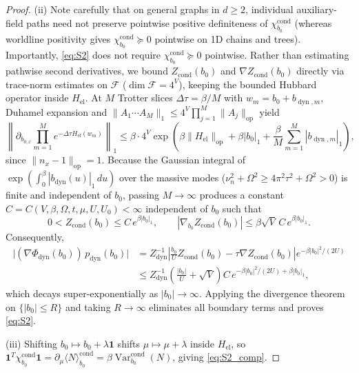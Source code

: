 \documentclass[11pt]{article}
\theoremstyle{definition}
\theoremstyle{remark}
\DeclareMathOperator{\Var}{Var}
\DeclareMathOperator{\op}{op}
\DeclareMathOperator{\cond}{cond}
\DeclareMathOperator{\dyn}{dyn}
\DeclareMathOperator{\el}{el}
\begin{document}
\begin{proof}
(ii) Note carefully that on general graphs in $d \ge 2$, individual auxiliary-field paths need not preserve pointwise positive definiteness of $\chi_{b_0}^{\cond}$ (whereas worldline positivity gives $\chi_{b_0}^{\cond} \succeq 0$ pointwise on 1D chains and trees). Importantly, \eqref{eq:S2} does not require $\chi_{b_0}^{\cond} \succeq 0$ pointwise. Rather than estimating pathwise second derivatives, we bound $Z_{\cond}(b_0)$ and $\nabla Z_{\cond}(b_0)$ directly via trace-norm estimates on $\mathcal{F}$ ($\dim \mathcal{F} = 4^V$), keeping the bounded Hubbard operator inside $H_{\el}$. At $M$ Trotter slices $\Delta\tau = \beta/M$ with $w_m = b_0 + b_{\dyn,m}$, Duhamel expansion and $\|A_1\cdots A_M\|_1 \le 4^V \prod_{j=1}^M \|A_j\|_{\op}$ yield
\[
\left\|\partial_{b_{0,x}} \prod_{m=1}^M e^{-\Delta\tau H_{\el}(w_m)}\right\|_1 \le \beta \cdot 4^V \exp\!\left(\beta\|H_{\el}\|_{\op} + \beta |b_0|_1 + \frac{\beta}{M}\sum_{m=1}^M |b_{\dyn,m}|_1\right),
\]
since $\|n_x - 1\|_{\op} = 1$. Because the Gaussian integral of $\exp(\int_0^\beta |b_{\dyn}(u)|_1\,du)$ over the massive modes ($\nu_n^2 + \Omega^2 \ge 4\pi^2\tau^2 + \Omega^2 > 0$) is finite and independent of $b_0$, passing $M \to \infty$ produces a constant $C = C(V, \beta, \Omega, t, \mu, U, U_0) < \infty$ independent of $b_0$ such that
\[
0 < Z_{\cond}(b_0) \le C\, e^{\beta |b_0|_1}, \qquad |\nabla_{b_0} Z_{\cond}(b_0)| \le \beta \sqrt{V}\, C\, e^{\beta |b_0|_1}.
\]
Consequently,
\begin{align*}
\bigl|(\nabla \Phi_{\dyn}(b_0))\, p_{\dyn}(b_0)\bigr|
&= Z_{\dyn}^{-1} \left|\frac{b_0}{U} Z_{\cond}(b_0) - \tau \nabla Z_{\cond}(b_0)\right| e^{-\beta |b_0|^2/(2U)} \\
&\le Z_{\dyn}^{-1}\left(\frac{|b_0|}{U} + \sqrt{V}\right) C\, e^{-\beta |b_0|^2/(2U) + \beta |b_0|_1},
\end{align*}
which decays super-exponentially as $|b_0| \to \infty$. Applying the divergence theorem on $\{|b_0| \le R\}$ and taking $R \to \infty$ eliminates all boundary terms and proves \eqref{eq:S2}.

(iii) Shifting $b_0 \mapsto b_0 + \lambda \mathbf{1}$ shifts $\mu \mapsto \mu + \lambda$ inside $H_{\el}$, so $\mathbf{1}^T \chi_{b_0}^{\cond} \mathbf{1} = \partial_\mu \langle N \rangle_{b_0}^{\cond} = \beta \Var_{b_0}^{\cond}(N)$, giving \eqref{eq:S2_comp}.
\end{proof}
\end{document}
